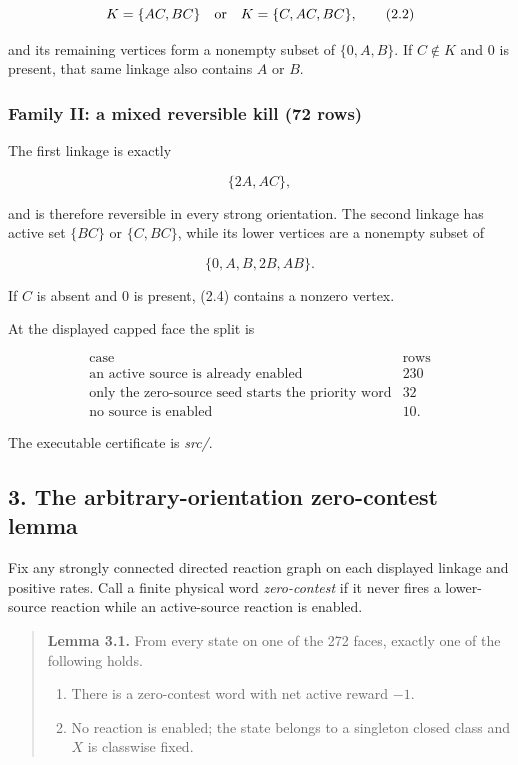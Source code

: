 \[
 K=\{AC,BC\}\quad\hbox{or}\quad K=\{C,AC,BC\},       \tag{2.2}
\]

and its remaining vertices form a nonempty subset of \(\{0,A,B\}\). If
\(C\notin K\) and \(0\) is present, that same linkage also contains
\(A\) or \(B\).

\subsubsection{Family II: a mixed reversible kill (72
rows)}

The first linkage is exactly

\[
 \{2A,AC\},                                           \tag{2.3}
\]

and is therefore reversible in every strong orientation. The second
linkage has active set \(\{BC\}\) or \(\{C,BC\}\), while its lower
vertices are a nonempty subset of

\[
 \{0,A,B,2B,AB\}.                                    \tag{2.4}
\]

If \(C\) is absent and \(0\) is present, (2.4) contains a nonzero
vertex.

At the displayed capped face the split is

\[
\begin{array}{c|r}
\text{case}&\text{rows}\\ \hline
\text{an active source is already enabled}&230\\
\text{only the zero-source seed starts the priority word}&32\\
\text{no source is enabled}&10.
\end{array}                                           \tag{2.5}
\]

The executable certificate is \emph{src/\texttt{}}.

\subsection{3. The arbitrary-orientation zero-contest
lemma}

Fix any strongly connected directed reaction graph on each displayed
linkage and positive rates. Call a finite physical word
\emph{zero-contest} if it never fires a lower-source reaction while an
active-source reaction is enabled.

\begin{quote}
\textbf{Lemma 3.1.} From every state on one of the 272 faces, exactly
one of the following holds.

\begin{enumerate}
\def\labelenumi{\arabic{enumi}.}
\tightlist
\item
  There is a zero-contest word with net active reward \(-1\).
\item
  No reaction is enabled; the state belongs to a singleton closed class
  and \(X\) is classwise fixed.
\end{enumerate}
\end{quote}

